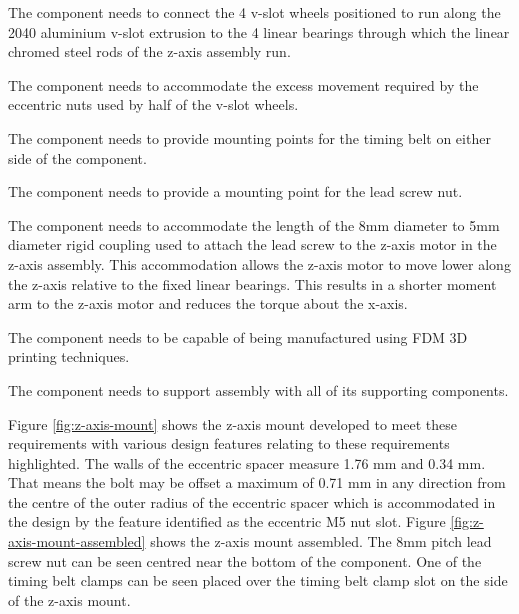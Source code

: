\begin{compactitem}
	\item The component needs to connect the 4 v-slot wheels positioned to run along the 2040 aluminium v-slot extrusion to the 4 linear bearings through which the linear chromed steel rods of the z-axis assembly run.
	\item The component needs to accommodate the excess movement required by the eccentric nuts used by half of the v-slot wheels.
	\item The component needs to provide mounting points for the timing belt on either side of the component.
	\item The component needs to provide a mounting point for the lead screw nut.
	\item The component needs to accommodate the length of the 8mm diameter to 5mm diameter rigid coupling used to attach the lead screw to the z-axis motor in the z-axis assembly. This accommodation allows the z-axis motor to move lower along the z-axis relative to the fixed linear bearings. This results in a shorter moment arm to the z-axis motor and reduces the torque about the x-axis.
	\item The component needs to be capable of being manufactured using FDM 3D printing techniques.
	\item The component needs to support assembly with all of its supporting components.
\end{compactitem}

Figure \ref{fig:z-axis-mount} shows the z-axis mount developed to meet these requirements with various design features relating to these requirements highlighted. The walls of the eccentric spacer measure 1.76 mm and 0.34 mm. That means the bolt may be offset a maximum of 0.71 mm in any direction from the centre of the outer radius of the eccentric spacer which is accommodated in the design by the feature identified as the eccentric M5 nut slot. Figure \ref{fig:z-axis-mount-assembled} shows the z-axis mount assembled. The 8mm pitch lead screw nut can be seen centred near the bottom of the component. One of the timing belt clamps can be seen placed over the timing belt clamp slot on the side of the z-axis mount.


